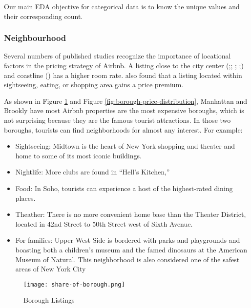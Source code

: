 Our main EDA objective for categorical data is to know the unique values and
their corresponding count.

\subsubsection*{Neighbourhood}
\label{eda:neighbourhood}

Several numbers of published studies recognize the importance of locational
factors in the pricing strategy of Airbnb.  A listing close to the city center
(\cite{gibbs2018use};\cite{li2016pros}; \cite{wang2017price};
\cite{zhang2017key};\cite{gibbs2018use}) and coastline (\cite{perez2018and}) has
a higher room rate.  \cite{perez2018and} also found that a listing located
within sightseeing, eating, or shopping area gains a price premium.

As shown in Figure \ref{fig:borough-number-of-listing} and Figure
\ref{fig:borough-price-distribution}, Manhattan and Brookly have most Airbnb
properties are the most expensive boroughs, which is not surprising because they
are the famous tourist attractions.  In those two boroughs, tourists can find
neighborhoods for almost any interest. For example:

\begin{itemize}
  \item Sightseeing: Midtown is the heart of New York shopping and theater and
    home to some of its most iconic buildings.
  \item Nightlife:  More clubs are found in “Hell’s Kitchen,”
  \item Food: In Soho, tourists can experience a host of the highest-rated
    dining places.
  \item Theather: There is no more convenient home base than
    the Theater District,  located in 42nd Street to 50th Street west of Sixth
    Avenue.
  \item For families: Upper West Side is bordered with parks and playgrounds and
  boasting both a children’s museum and the famed dinosaurs at the American Museum
  of Natural. This neighborhood is also considered one of the safest areas of New
  York City
\end{itemize}


\begin{figure}[!htbp] \centering
  \texttt{[image: share-of-borough.png]}
    \caption{Borough Listings}
    \label{fig:borough-number-of-listing}
\end{figure}


